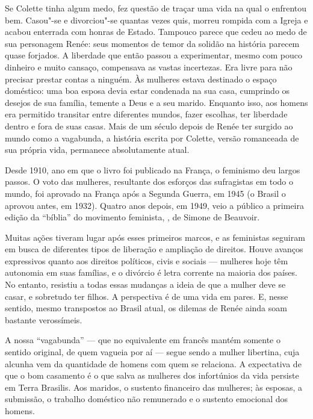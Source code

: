 \begin{changemargin}
Se Colette tinha algum medo, fez questão de traçar uma vida na qual o enfrentou bem. Casou"-se e divorciou"-se quantas vezes quis, morreu rompida com a Igreja e acabou enterrada com honras de Estado. Tampouco parece que cedeu ao medo de sua personagem Renée: seus momentos de temor da solidão na história parecem quase forjados. A liberdade que então passou a experimentar, mesmo com pouco dinheiro e muito cansaço, compensava as vastas incertezas. Era livre para não precisar prestar contas a ninguém. Às mulheres estava destinado o espaço doméstico: uma boa esposa devia estar condenada na sua casa, cumprindo os desejos de sua família, temente a Deus e a seu marido. Enquanto isso, aos homens era permitido transitar entre diferentes mundos, fazer escolhas, ter liberdade dentro e fora de suas casas. Mais de um século depois de Renée ter surgido ao mundo como a vagabunda, a história escrita por Colette, versão romanceada de sua própria vida, permanece absolutamente atual.

Desde 1910, ano em que o livro foi publicado na França, o feminismo deu largos passos. O voto das mulheres, resultante dos esforços das sufragistas em todo o mundo, foi aprovado na França após a Segunda Guerra, em 1945 (o Brasil o aprovou antes, em 1932). Quatro anos depois, em 1949, veio a público a primeira edição da “bíblia” do movimento feminista, {}, de Simone de Beauvoir.

Muitas ações tiveram lugar após esses primeiros marcos, e as feministas seguiram em busca de diferentes tipos de liberação e ampliação de direitos. Houve avanços expressivos quanto aos direitos políticos, civis e sociais --- mulheres hoje têm autonomia em suas famílias, e o divórcio é letra corrente na maioria dos países. No entanto, resistiu a todas essas mudanças a ideia de que a mulher deve se casar, e sobretudo ter filhos. A perspectiva é de uma vida em pares. E, nesse sentido, mesmo transpostos ao Brasil atual, os dilemas de Renée ainda soam bastante verossímeis. 

A nossa “vagabunda” --- que no equivalente em francês {} mantém somente o sentido original, de quem vagueia por aí --- segue sendo a mulher libertina, cuja alcunha vem da quantidade de homens com quem se relaciona. A expectativa de que o bom casamento é o que salva as mulheres dos infortúnios da vida persiste em Terra Brasilis. Aos maridos, o sustento financeiro das mulheres; às esposas, a submissão, o trabalho doméstico não remunerado e o sustento emocional dos homens.


\end{changemargin}
